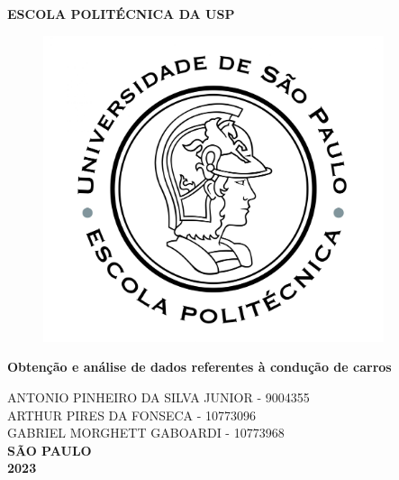 \thispagestyle{empty}

\vfill
 \begin{center}
    {\large\bfseries ESCOLA POLITÉCNICA DA USP} \\
    \vspace*{1in}
    \begin{figure}[h]
     \centering
            \includegraphics[width=10cm]{figures/Logo_Poli.jpg}\\
     \end{figure}
    \vspace*{1in}
    \large\bfseries Obtenção e análise de dados referentes à condução de carros
    
    \vspace{1.5cm}
    ANTONIO PINHEIRO DA SILVA JUNIOR - 9004355\\
    ARTHUR PIRES DA FONSECA - 10773096\\
    GABRIEL MORGHETT GABOARDI - 10773968\\
    \vfill
    \large\bfseries{ SÃO PAULO \\ 2023}
\end{center}

\normalsize